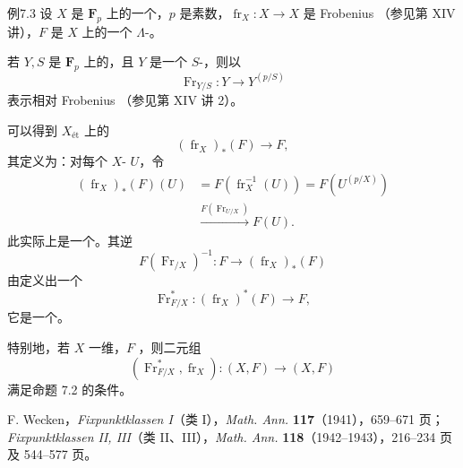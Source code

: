 \begin{SGAresult}{例}{7.3}
设 $X$ 是 $\mathbf F_p$ 上的一个，$p$ 是素数，$\operatorname{fr}_X:X\longrightarrow X$ 是 Frobenius （参见第 XIV 讲），$F$ 是 $X$ 上的一个 $\Lambda$-。

若 $Y,S$ 是 $\mathbf F_p$ 上的，且 $Y$ 是一个 $S$-，则以
\[
\operatorname{Fr}_{Y/S}:Y\longrightarrow Y^{(p/S)}
\]
表示相对 Frobenius （参见第 XIV 讲 2）。

可以得到 $X_{\text{ét}}$ 上的
\[
(\operatorname{fr}_X)_*(F)\longrightarrow F,
\]
其定义为：对每个 $X$- $U$，令
\[
\begin{aligned}
(\operatorname{fr}_X)_*(F)(U)
 &=F(\operatorname{fr}_X^{-1}(U))=F(U^{(p/X)})\\
 &\xrightarrow{F(\operatorname{Fr}_{U/X})}F(U).
\end{aligned}
\]
此实际上是一个。其逆
\[
F(\operatorname{Fr}_{/X})^{-1}:F\longrightarrow(\operatorname{fr}_X)_*(F)
\]
由定义出一个
\[
\operatorname{Fr}_{F/X}^{*}:(\operatorname{fr}_X)^*(F)\longrightarrow F,
\]
它是一个。

特别地，若 $X$ 一维，$F$ ，则二元组
\[
(\operatorname{Fr}_{F/X}^{*},\operatorname{fr}_X):(X,F)\longrightarrow(X,F)
\]
满足命题 7.2 的条件。
\end{SGAresult}

\medskip
\noindent [1]\quad F. Wecken，\textit{Fixpunktklassen I}（类 I），\textit{Math. Ann.} \textbf{117}（1941），659--671 页；
\textit{Fixpunktklassen II, III}（类 II、III），\textit{Math. Ann.} \textbf{118}（1942--1943），216--234 页及 544--577 页。
